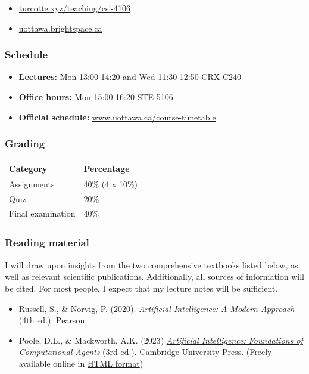 \documentclass[
  letterpaper,
  DIV=11,
  numbers=noendperiod]{scrartcl}
\providecommand{\tightlist}{%
  \setlength{\itemsep}{0pt}\setlength{\parskip}{0pt}}
\begin{document}
\begin{itemize}
\tightlist
\item
  \href{https://turcotte.xyz/teaching/csi-4106}{turcotte.xyz/teaching/csi-4106}
\item
  \href{https://uottawa.brightspace.ca}{uottawa.brightspace.ca}
\end{itemize}

\subsubsection{Schedule}\label{schedule}

\begin{itemize}
\tightlist
\item
  \textbf{Lectures:} Mon 13:00-14:20 and Wed 11:30-12:50 CRX C240
\item
  \textbf{Office hours:} Mon 15:00-16:20 STE 5106
\item
  \textbf{Official schedule:}
  \href{https://www.uottawa.ca/course-timetable}{www.uottawa.ca/course-timetable}
\end{itemize}

\subsubsection{Grading}\label{grading}

\begin{longtable}[]{@{}ll@{}}
\toprule\noalign{}
Category & Percentage \\
\midrule\noalign{}
\endhead
\bottomrule\noalign{}
\endlastfoot
Assignments & 40\% (4 x 10\%) \\
Quiz & 20\% \\
Final examination & 40\% \\
\end{longtable}

\subsubsection{Reading material}\label{reading-material}

I will draw upon insights from the two comprehensive textbooks listed
below, as well as relevant scientific publications. Additionally, all
sources of information will be cited. For most people, I expect that my
lecture notes will be sufficient.

\begin{itemize}
\tightlist
\item
  Russell, S., \& Norvig, P. (2020).
  \href{https://aima.cs.berkeley.edu/}{\emph{Artificial Intelligence: A
  Modern Approach}} (4th ed.). Pearson.
\item
  Poole, D.L., \& Mackworth, A.K. (2023)
  \href{https://artint.info}{\emph{Artificial Intelligence: Foundations
  of Computational Agents}} (3rd ed.). Cambridge University Press.
  (Freely available online in
  \href{https://artint.info/3e/html/ArtInt3e.html}{HTML format})
\end{itemize}
\end{document}
